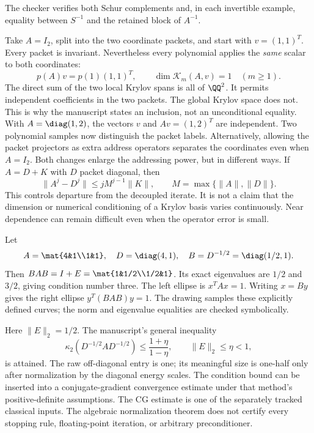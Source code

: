 The checker verifies both Schur complements and, in each invertible example, equality between $S^{-1}$ and the retained block of $A^{-1}$.

Take $A=I_2$, split into the two coordinate packets, and start with $v=(1,1)^T$. Every packet is invariant. Nevertheless every polynomial applies the \emph{same} scalar to both coordinates:
\[
p(A)v=p(1)(1,1)^T,\qquad \dim\mathcal K_m(A,v)=1\quad(m\ge1).
\]
The direct sum of the two local Krylov spans is all of $\QQ^2$. It permits independent coefficients in the two packets. The global Krylov space does not. This is why the manuscript states an inclusion, not an unconditional equality.
With $A=\diag(1,2)$, the vectors $v$ and $Av=(1,2)^T$ are independent. Two polynomial samples now distinguish the packet labels. Alternatively, allowing the packet projectors as extra address operators separates the coordinates even when $A=I_2$. Both changes enlarge the addressing power, but in different ways.
If $A=D+K$ with $D$ packet diagonal, then
\[
\|A^j-D^j\|\le jM^{j-1}\|K\|,
\qquad M=\max\{\|A\|,\|D\|\}.
\]
This controls departure from the decoupled iterate. It is not a claim that the dimension or numerical conditioning of a Krylov basis varies continuously. Near dependence can remain difficult even when the operator error is small.

Let
\[
A=\mat{4&1\\1&1},\quad D=\diag(4,1),\quad
B=D^{-1/2}=\diag(1/2,1).
\]
Then $BAB=I+E=\mat{1&1/2\\1/2&1}$. Its exact eigenvalues are $1/2$ and $3/2$, giving condition number three.
The left ellipse is $x^TAx=1$. Writing $x=By$ gives the right ellipse $y^T(BAB)y=1$. The drawing samples these explicitly defined curves; the norm and eigenvalue equalities are checked symbolically.

Here $\|E\|_2=1/2$. The manuscript's general inequality
\[
\kappa_2(D^{-1/2}AD^{-1/2})
\le\frac{1+\eta}{1-\eta},\qquad \|E\|_2\le\eta<1,
\]
is attained. The raw off-diagonal entry is one; its meaningful size is one-half only after normalization by the diagonal energy scales.
The condition bound can be inserted into a conjugate-gradient convergence estimate under that method's positive-definite assumptions. The CG estimate is one of the separately tracked classical inputs. The algebraic normalization theorem does not certify every stopping rule, floating-point iteration, or arbitrary preconditioner.

